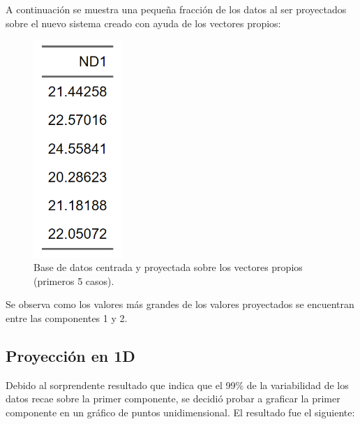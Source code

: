 \documentclass[11pt, letterpaper]{article}
\begin{document}
A continuación se muestra una pequeña fracción de los datos al ser proyectados sobre el nuevo sistema creado con ayuda de los vectores propios:

\begin{figure}[h!]
	\centering
	\begin{minipage}{0.8\textwidth}
		\centering
		\includegraphics[width=0.3\textwidth]{IMG/T2.png}
		\caption{Base de datos centrada y proyectada sobre los vectores propios (primeros 5 casos).}
		\label{fig:f4}
	\end{minipage}\hfill
\end{figure}

Se observa como los valores más grandes de los valores proyectados se encuentran entre las componentes 1 y 2.

\newpage

\subsection{Proyección en 1D}

Debido al sorprendente resultado que indica que el 99\% de la variabilidad de los datos recae sobre la primer componente, se decidió probar a graficar la primer componente en un gráfico de puntos unidimensional. El resultado fue el siguiente:
\end{document}
